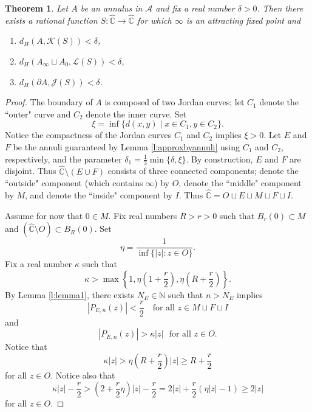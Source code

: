 \documentclass[a4paper,11pt,onecolumn]{amsart}
\newtheorem{theorem}{Theorem}[section]
\theoremstyle{definition}
\begin{document}
  \begin{theorem} \label{t:HausdorffRationalAnnuliVersion}
  Let $A$ be an annulus in $\mathcal{A}$ and fix a real number $\delta >0$.  Then there exists a rational function $S:\hat{\mathbb{C}} \rightarrow \hat{\mathbb{C}}$ for which $\infty$ is an attracting fixed point and 
  \begin{enumerate}
  \item $d_H(A,\mathcal{K}(S)) < \delta$,
  \item $d_H(A_{\infty} \sqcup A_0, \mathcal{L}(S)) < \delta$,
  \item $d_H(\partial A, \mathcal{J}(S)) < \delta$.
  \end{enumerate}
  \end{theorem}
  
  \begin{proof}
  

  The boundary of $A$ is composed of two Jordan curves; let $C_1$ denote the ``outer" curve and $C_2$ denote the inner curve.  Set 
  $$ \xi = \inf \{d(x,y) \mid x \in C_1, y \in C_2\}.$$
  Notice the compactness of the Jordan curves $C_1$ and $C_2$ implies $\xi>0$.  Let $E$ and $F$ be the annuli guaranteed by Lemma \ref{l:approxbyannuli} using $C_1$ and $C_2$, respectively, and the parameter $\delta_1 =  \frac{1}{3}\min\{\delta,\xi\}$.   By construction, $E$ and $F$ are disjoint.  Thus $\hat{\mathbb{C}} \setminus (E \cup F)$ consists of three connected components; denote the ``outside" component (which contains $\infty$) by $O$, denote the ``middle" component by $M$, and denote the ``inside" component by $I$.  Thus $\hat{\mathbb{C}} = O \sqcup E \sqcup M \sqcup F \sqcup I$.  
  
Assume for now that $0 \in M$.  Fix real numbers $R>r>0$ such that $B_r(0) \subset M$ and $(\hat{\mathbb{C}} \setminus O) \subset B_R(0)$.  
Set $$\eta = \frac{1}{ \inf\{|z| : z \in O\} }.$$   Fix a real number $\kappa$ such that 
$$\kappa > \max \left\{1, \eta (1+\frac{r}{2}), \eta (R+ \frac{r}{2})\right\}.$$
By Lemma \ref{l:lemma1}, there exists $N_E \in \mathbb{N}$ such that $n > N_E$ implies 
$$\left|P_{E,n} (z)\right| < \frac{r}{2} \ \ \ \textrm{ for all } z \in M \sqcup F \sqcup I$$ and 
$$|P_{E,n}(z)| > \kappa |z|  \ \ \  \textrm{for all } z \in O.$$
Notice that $$\kappa |z| > \eta (R + \frac{r}{2}) |z| \geq R+ \frac{r}{2}$$ for all $z \in O$.  Notice also that 
\begin{equation} \label{eq:bigenough}
\kappa |z| - \frac{r}{2} > (2 + \frac{r}{2} \eta) |z| - \frac{r}{2} = 2|z| + \frac{r}{2}(\eta |z| -1)  \geq 2 |z|
\end{equation} for all $z \in O$.  


\end{proof}
\end{document}
